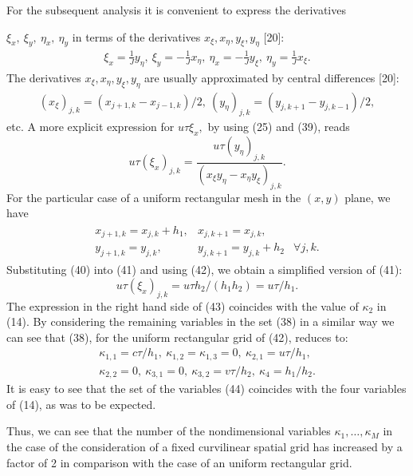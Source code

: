     For the subsequent analysis it is convenient to express the derivatives

$\xi_x,~\xi_y,~\eta_x,~\eta_y$
in terms of the derivatives $x_\xi,x_\eta,y_\xi,y_\eta$ [20]:
\begin{eqnarray}
\xi_x=\frac{1}{J}y_\eta,~\xi_y=-\frac{1}{J}x_\eta,
~\eta_x=-\frac{1}{J}y_\xi,~\eta_y=\frac{1}{J}x_\xi.
\end{eqnarray}
The derivatives $x_\xi,x_\eta,y_\xi,y_\eta$ are usually approximated by central
differences [20]:
\begin{eqnarray}
(x_\xi)_{j,k}=(x_{j+1,k}-x_{j-1,k})/2,~(y_\eta)_{j,k}=(y_{j,k+1}-y_{j,k-1})/2,
\end{eqnarray}
etc. A more explicit expression for $u\tau\xi_x,$ by using (25) and (39), reads
\begin{equation}
u\tau(\xi_x)_{j,k}=\frac{u\tau(y_\eta)_{j,k}}{(x_\xi y_\eta-x_\eta y_\xi)_{j,k}}.
\end{equation}
For the particular case of a uniform rectangular mesh in the $(x,y)$ plane, we
have
\begin{eqnarray}
\begin{array}{lll}
x_{j+1,k}=x_{j,k}+h_1, & x_{j,k+1}=x_{j,k}, & ~\\
y_{j+1,k}=y_{j,k},     & y_{j,k+1}=y_{j,k}+h_2&\forall j,k.
\end{array}
\end{eqnarray}
Substituting (40) into (41) and using (42), we obtain a simplified version of
(41):
\begin{equation}
u\tau(\xi_x)_{j,k}=u\tau h_2/(h_1h_2)=u\tau/h_1.
\end{equation}
The expression in the right hand side of (43) coincides with the value of
$\kappa_2$ in (14). By considering the remaining variables in the set (38) in
a similar way we can see that (38), for the uniform rectangular grid of (42),
reduces to:
\begin{eqnarray}
\kappa_{1,1}=c\tau/h_1,~\kappa_{1,2}=\kappa_{1,3}=0,~\kappa_{2,1}=u\tau/h_1,
\nonumber\\
\kappa_{2,2}=0,~\kappa_{3,1}=0,~\kappa_{3,2}=v\tau/h_2,~\kappa_4=h_1/h_2.
\end{eqnarray}
It is easy to see that the set of the variables (44) coincides with the four
variables of (14), as was to be expected.

   Thus, we can see that the number of the nondimensional variables $\kappa_1,
\ldots,\kappa_M$ in the case of the consideration of a fixed curvilinear
spatial grid has increased by a factor of 2 in comparison with the case of an
uniform rectangular grid.

